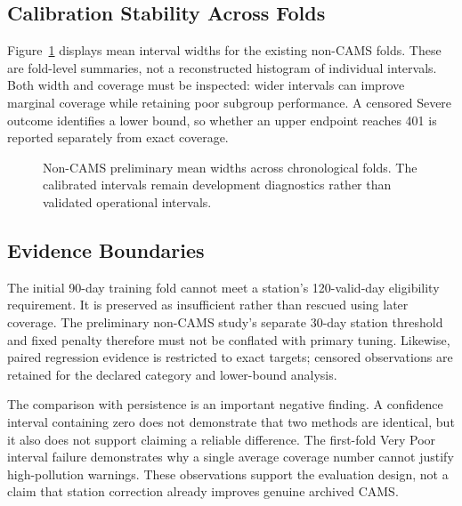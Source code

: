 \subsection{Calibration Stability Across Folds}
Figure~\ref{fig:width} displays mean interval widths for the existing non-CAMS
folds. These are fold-level summaries, not a reconstructed histogram of
individual intervals. Both width and coverage must be inspected: wider
intervals can improve marginal coverage while retaining poor subgroup
performance. A censored Severe outcome identifies a lower bound, so whether
an upper endpoint reaches 401 is reported separately from exact coverage.
\begin{figure}[t]\centering\AirGuardWidths
\caption{Non-CAMS preliminary mean widths across chronological folds.
The calibrated intervals remain development diagnostics rather than
validated operational intervals.}\label{fig:width}\end{figure}

\subsection{Evidence Boundaries}
The initial 90-day training fold cannot meet a station's 120-valid-day
eligibility requirement. It is preserved as insufficient rather than
rescued using later coverage. The preliminary non-CAMS study's separate
30-day station threshold and fixed penalty therefore must not be conflated
with primary tuning. Likewise, paired regression evidence is restricted to
exact targets; censored observations are retained for the declared category
and lower-bound analysis.

The comparison with persistence is an important negative finding.
A confidence interval containing zero does not demonstrate that two methods
are identical, but it also does not support claiming a reliable difference.
The first-fold Very Poor interval failure demonstrates why a single average
coverage number cannot justify high-pollution warnings. These observations
support the evaluation design, not a claim that station correction already
improves genuine archived CAMS.
